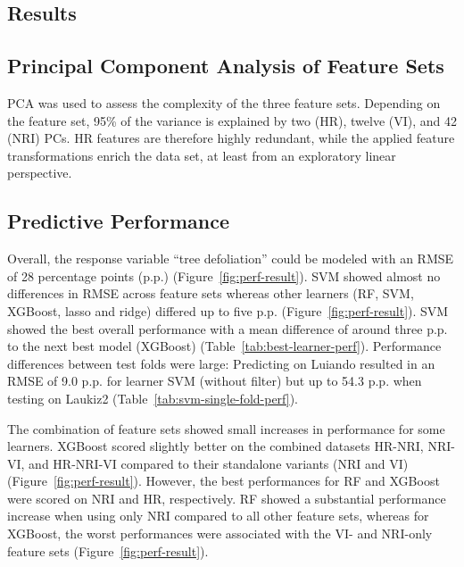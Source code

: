 \documentclass[remotesensing,article,accept,moreauthors,pdftex]{Definitions/mdpi}
\begin{document}
\begin{paracol}{2}
\section{Results}

\subsection{Principal Component Analysis of Feature Sets}

PCA was used to assess the complexity of the three feature sets.
Depending on the feature set, 95\% of the variance is explained by two (HR), twelve (VI), and 42 (NRI) \ac{PC}s.
HR features are therefore highly redundant, while the applied feature transformations enrich the data set, at least from an exploratory linear perspective.

\subsection{Predictive Performance}

Overall, the response variable \enquote{tree defoliation} could be modeled with an \ac{RMSE} of 28 percentage points (p.p.) (Figure~\ref{fig:perf-result}).
SVM showed almost no differences in RMSE across feature sets whereas other learners (RF, SVM, XGBoost, lasso and ridge) differed up to five p.p. (Figure~\ref{fig:perf-result}).
SVM showed the best overall performance with a mean difference of around three p.p. to the next best model (XGBoost) (Table~\ref{tab:best-learner-perf}).
Performance differences between test folds were large: Predicting on Luiando resulted in an RMSE of 9.0 p.p. for learner SVM (without filter) but up to 54.3 p.p. when testing on Laukiz2 (Table~\ref{tab:svm-single-fold-perf}).

The combination of feature sets showed small increases in performance for some learners.
XGBoost scored slightly better on the combined datasets HR-NRI, NRI-VI, and HR-NRI-VI compared to their standalone variants (NRI and VI) (Figure~\ref{fig:perf-result}).
However, the best performances for RF and XGBoost were scored on NRI and HR, respectively.
RF showed a substantial performance increase when using only NRI compared to all other feature sets, whereas for XGBoost, the worst performances were associated with the VI- and NRI-only feature sets (Figure~\ref{fig:perf-result}).


\end{paracol}
\end{document}
